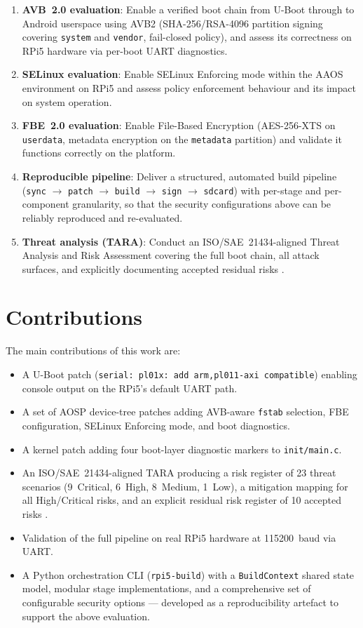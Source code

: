 \begin{enumerate}
    \item \textbf{AVB~2.0 evaluation}: Enable a verified boot chain from U-Boot through to Android userspace using AVB2 (SHA-256/RSA-4096 partition signing covering \texttt{system} and \texttt{vendor}, fail-closed policy), and assess its correctness on RPi5 hardware via per-boot UART diagnostics.
    \item \textbf{SELinux evaluation}: Enable SELinux Enforcing mode within the AAOS environment on RPi5 and assess policy enforcement behaviour and its impact on system operation.
    \item \textbf{FBE~2.0 evaluation}: Enable File-Based Encryption (AES-256-XTS on \texttt{userdata}, metadata encryption on the \texttt{metadata} partition) and validate it functions correctly on the platform.
    \item \textbf{Reproducible pipeline}: Deliver a structured, automated build pipeline (\texttt{sync} $\to$ \texttt{patch} $\to$ \texttt{build} $\to$ \texttt{sign} $\to$ \texttt{sdcard}) with per-stage and per-component granularity, so that the security configurations above can be reliably reproduced and re-evaluated.
    \item \textbf{Threat analysis (TARA)}: Conduct an ISO/SAE~21434-aligned Threat Analysis and Risk Assessment covering the full boot chain, all attack surfaces, and explicitly documenting accepted residual risks \cite{iso_sae_21434}.
\end{enumerate}

\section{Contributions}

The main contributions of this work are:

\begin{itemize}
    \item A U-Boot patch (\texttt{serial: pl01x: add arm,pl011-axi compatible}) enabling console output on the RPi5's default UART path.
    \item A set of AOSP device-tree patches adding AVB-aware \texttt{fstab} selection, FBE configuration, SELinux Enforcing mode, and boot diagnostics.
    \item A kernel patch adding four boot-layer diagnostic markers to \texttt{init/main.c}.
    \item An ISO/SAE~21434-aligned TARA producing a risk register of 23 threat scenarios (9~Critical, 6~High, 8~Medium, 1~Low), a mitigation mapping for all High/Critical risks, and an explicit residual risk register of 10 accepted risks \cite{iso_sae_21434}.
    \item Validation of the full pipeline on real RPi5 hardware at 115200~baud via UART.
    \item A Python orchestration CLI (\texttt{rpi5-build}) with a \texttt{BuildContext} shared state model, modular stage implementations, and a comprehensive set of configurable security options --- developed as a reproducibility artefact to support the above evaluation.
\end{itemize}

